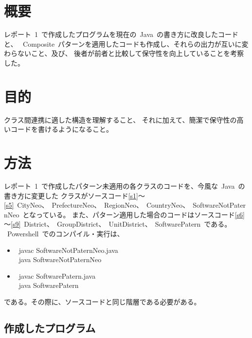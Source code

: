 \documentclass[10pt]{jarticle}
\title{\framebox{\hspace{4zw}ソフトウェア工学 レポート2%
                 \hspace{4zw}}}
\author{神野　友哉 \\
        2022311042  \\
        愛知県立大学 情報科学部 情報科学科}
\date{2024年7月14日}
\begin{document}
\maketitle

\section{概要} \label{sec:hajime}
レポート\ 1\ で作成したプログラムを現在の\ Java\ の書き方に改良したコードと、
\ Composite\ パターンを適用したコードも作成し、それらの出力が互いに変わらないこと、及び、
後者が前者と比較して保守性を向上していることを考察した。

\section{目的} \label{sec:mokuteki}
クラス間連携に適した構造を理解すること、
それに加えて、簡潔で保守性の高いコードを書けるようになること。

\section{方法} \label{sec:houhou}
レポート\ 1\ で作成したパターン未適用の各クラスのコードを、今風な\ Java\ の書き方に変更した
クラスがソースコード\ref{s1}～\ref{s5}\ CityNeo、\ PrefectureNeo、\ RegionNeo、\ CountryNeo、\ SoftwareNotPaternNeo\ となっている。
また、パターン適用した場合のコードはソースコード\ref{s6}～\ref{s9}\ District、\ GroupDistrict、\ UnitDistrict、\ SoftwarePatern\ である。
\ Powershell\ でのコンパイル・実行は、
\begin{itemize}
	\setlength{\leftskip}{7mm}
	\item[前者 : ] \ javac SoftwareNotPaternNeo.java\ \\
		\ java SoftwareNotPaternNeo\ 
	\item[後者 : ] \ javac SoftwarePatern.java\ \\
		\ java SoftwarePatern\
\end{itemize}
である。その際に、ソースコードと同じ階層である必要がある。

\subsection{作成したプログラム}









\end{document}
